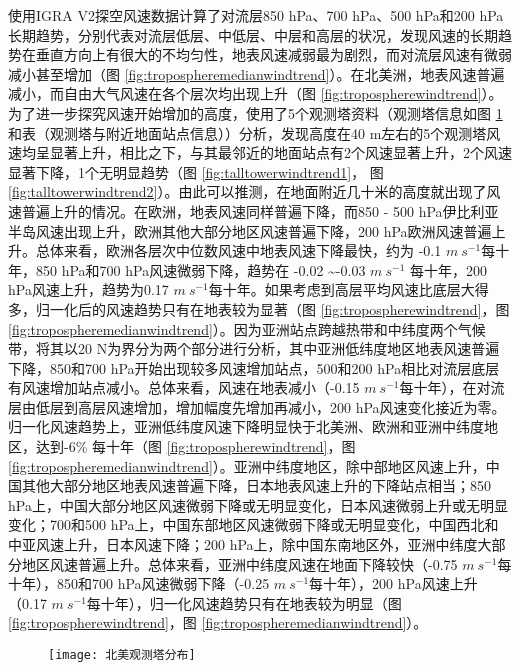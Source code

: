 使用IGRA V2探空风速数据计算了对流层850 hPa、700 hPa、500 hPa和200 hPa长期趋势，分别代表对流层低层、中低层、中层和高层的状况，发现风速的长期趋势在垂直方向上有很大的不均匀性，地表风速减弱最为剧烈，而对流层风速有微弱减小甚至增加（图 \ref{fig:tropospheremedianwindtrend}）。在北美洲，地表风速普遍减小，而自由大气风速在各个层次均出现上升（图 \ref{fig:tropospherewindtrend}）。为了进一步探究风速开始增加的高度，使用了5个观测塔资料（观测塔信息如图 \ref{fig:talltower}和表（观测塔与附近地面站点信息））分析，发现高度在40 m左右的5个观测塔风速均呈显著上升，相比之下，与其最邻近的地面站点有2个风速显著上升，2个风速显著下降，1个无明显趋势（图 \ref{fig:talltowerwindtrend1}， 图 \ref{fig:talltowerwindtrend2}）。由此可以推测，在地面附近几十米的高度就出现了风速普遍上升的情况。在欧洲，地表风速同样普遍下降，而850 - 500 hPa伊比利亚半岛风速出现上升，欧洲其他大部分地区风速普遍下降，200 hPa欧洲风速普遍上升。总体来看，欧洲各层次中位数风速中地表风速下降最快，约为 -0.1 $m ~ s^{-1}$每十年，850  hPa和700 hPa风速微弱下降，趋势在 -0.02 \textasciitilde -0.03 $m ~ s^{-1}$ 每十年，200 hPa风速上升，趋势为0.17 $m ~ s^{-1}$每十年。如果考虑到高层平均风速比底层大得多，归一化后的风速趋势只有在地表较为显著（图 \ref{fig:tropospherewindtrend}，图 \ref{fig:tropospheremedianwindtrend}）。因为亚洲站点跨越热带和中纬度两个气候带，将其以20 N为界分为两个部分进行分析，其中亚洲低纬度地区地表风速普遍下降，850和700 hPa开始出现较多风速增加站点，500和200 hPa相比对流层底层有风速增加站点减小。总体来看，风速在地表减小（-0.15 $m ~ s^{-1}$每十年），在对流层由低层到高层风速增加，增加幅度先增加再减小，200 hPa风速变化接近为零。归一化风速趋势上，亚洲低纬度风速下降明显快于北美洲、欧洲和亚洲中纬度地区，达到-6\% 每十年（图 \ref{fig:tropospherewindtrend}，图 \ref{fig:tropospheremedianwindtrend}）。亚洲中纬度地区，除中部地区风速上升，中国其他大部分地区地表风速普遍下降，日本地表风速上升的下降站点相当；850 hPa上，中国大部分地区风速微弱下降或无明显变化，日本风速微弱上升或无明显变化；700和500 hPa上，中国东部地区风速微弱下降或无明显变化，中国西北和中亚风速上升，日本风速下降；200 hPa上，除中国东南地区外，亚洲中纬度大部分地区风速普遍上升。总体来看，亚洲中纬度风速在地面下降较快（-0.75 $m ~ s^{-1}$每十年），850和700 hPa风速微弱下降（-0.25 $m ~ s^{-1}$每十年），200 hPa风速上升（0.17 $m ~ s^{-1}$每十年），归一化风速趋势只有在地表较为明显（图 \ref{fig:tropospherewindtrend}，图 \ref{fig:tropospheremedianwindtrend}）。


\begin{figure}[!htbp]
    \centering
    \texttt{[image: 北美观测塔分布]}
    \label{fig:talltower}
\end{figure}

